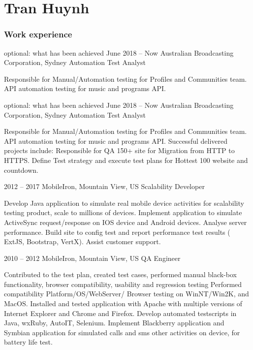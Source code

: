 \documentclass{tccv}
\begin{document}
\part{Tran Huynh}

\section{Work experience}

\begin{eventlist}
\item [optional: what has been achieved]{June 2018 -- Now}
     {Australian Broadcasting Corporation, Sydney}
     {Automation Test Analyst}

Responsible for Manual/Automation testing for Profiles and Communities team.
\newline API automation testing for music and programs API.
\item[optional: what has been achieved]{June 2018 -- Now}
     {Australian Broadcasting Corporation, Sydney}
     {Automation Test Analyst}

Responsible for Manual/Automation testing for Profiles and Communities team.
\newline API automation testing for music and programs API.
\newline Successful delivered projects include: 
\newline Responsible for QA 150+ site for Migration from HTTP to HTTPS.
\newline Define Test strategy and execute test plans for Hottest 100 website and countdown.

\item{2012 -- 2017}
     {MobileIron, Mountain View, US}
     {Scalability Developer}

Develop Java application to simulate real mobile device
activities for scalability testing product, scale to millions
of devices.
Implement application to simulate ActiveSync request/response on IOS device and Android devices.
Analyse server performance.
\newline Build site to config test and report performance test results
 ( ExtJS, Bootstrap, VertX).
\newline Assist customer support.

\item{2010 -- 2012}
     {MobileIron, Mountain View, US}
     {QA Engineer}

Contributed to the test plan, created test cases,
  performed manual black-box functionality, browser
  compatibility, usability and regression testing
\newline Performed compatibility Platform/OS/WebServer/
\newline Browser testing on WinNT/Win2K, and MacOS.
  Installed and tested application with Apache with
  multiple versions of Internet Explorer and Chrome and Firefox.
\newline Develop automated testscripts in Java, wxRuby, AutoIT, Selenium.
\newline Implement Blackberry application and Symbian application for simulated
calls and sms other activities on device, for battery life test.


\end{eventlist}
\end{document}
